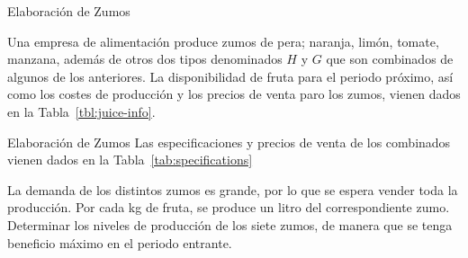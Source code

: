 \documentclass[../../main.tex]{subfiles}
\begin{document}
\begin{frame}{Elaboración de Zumos}{}

  Una empresa de alimentación produce zumos de pera; naranja, limón, tomate, manzana, además de otros dos tipos denominados $H$ y $G$ que son combinados de algunos de los anteriores. La disponibilidad de fruta para el periodo próximo, así como los costes de producción y los precios de venta paro los zumos, vienen dados en la Tabla~\ref{tbl:juice-info}.
            \begin{table}[!ht]
        \caption{\label{tbl:juice-info}Información para elaboración de zumos.}
    \centering
    \end{table}
    
    
  \end{frame}
  
  \begin{frame}{Elaboración de Zumos}{}
    Las especificaciones y precios de venta de los combinados vienen dados en la Tabla~\ref{tab:specifications}
    
          \begin{table}
    \caption{\label{tab:specifications}Especificación de zumos combinados.}
    \centering
  \end{table}

      La demanda de los distintos zumos es grande, por lo que se espera vender toda la producción. Por cada kg de fruta, se produce un litro del correspondiente zumo. Determinar los niveles de producción de los siete zumos, de manera que se tenga beneficio máximo en el periodo entrante.%
    \end{frame}
\end{document}
